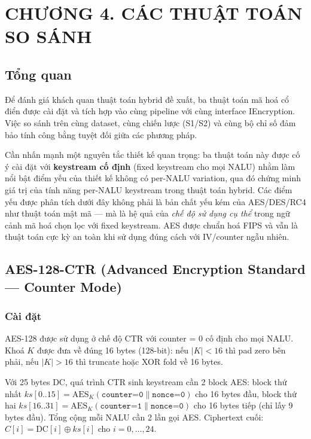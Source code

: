 \clearpage
{}
\section*{CHƯƠNG 4. CÁC THUẬT TOÁN SO SÁNH}
\label{ch:baseline}
\setcounter{section}{4}
\setcounter{subsection}{0}
\setcounter{figure}{0}
\setcounter{table}{0}
\setcounter{equation}{0}

\subsection{Tổng quan}

Để đánh giá khách quan thuật toán hybrid đề xuất, ba thuật toán mã hoá cổ điển được cài đặt và tích hợp vào cùng pipeline với cùng interface IEncryption. Việc so sánh trên cùng dataset, cùng chiến lược (S1/S2) và cùng bộ chỉ số đảm bảo tính công bằng tuyệt đối giữa các phương pháp.

Cần nhấn mạnh một nguyên tắc thiết kế quan trọng: ba thuật toán này được cố ý cài đặt với \textbf{keystream cố định} (fixed keystream cho mọi NALU) nhằm làm nổi bật điểm yếu của thiết kế không có per-NALU variation, qua đó chứng minh giá trị của tính năng per-NALU keystream trong thuật toán hybrid. Các điểm yếu được phân tích dưới đây không phải là bản chất yếu kém của AES/DES/RC4 như thuật toán mật mã --- mà là hệ quả của \emph{chế độ sử dụng cụ thể} trong ngữ cảnh mã hoá chọn lọc với fixed keystream. AES được chuẩn hoá FIPS và vẫn là thuật toán cực kỳ an toàn khi sử dụng đúng cách với IV/counter ngẫu nhiên.

\subsection{AES-128-CTR (Advanced Encryption Standard --- Counter Mode)}

\subsubsection{Cài đặt}

AES-128 được sử dụng ở chế độ CTR với counter = 0 cố định cho mọi NALU. Khoá $K$ được đưa về đúng 16 bytes (128-bit): nếu $|K| < 16$ thì pad zero bên phải, nếu $|K| > 16$ thì truncate hoặc XOR fold về 16 bytes.

Với 25 bytes DC, quá trình CTR sinh keystream cần 2 block AES: block thứ nhất $ks[0..15] = \text{AES}_K(\texttt{counter=0} \| \texttt{nonce=0})$ cho 16 bytes đầu, block thứ hai $ks[16..31] = \text{AES}_K(\texttt{counter=1} \| \texttt{nonce=0})$ cho 16 bytes tiếp (chỉ lấy 9 bytes đầu). Tổng cộng mỗi NALU cần 2 lần gọi AES. Ciphertext cuối: $C[i] = \text{DC}[i] \oplus ks[i]$ cho $i = 0, \ldots, 24$.

